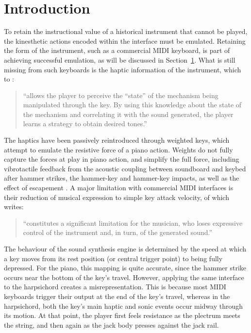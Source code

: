 \section{Introduction}

To retain the instructional value of a historical instrument that cannot be played, the kinesthetic actions encoded within the interface must be emulated. Retaining the form of the instrument, such as a commercial MIDI keyboard, is part of achieving successful emulation, as will be discussed in Section~\ref{}. 
What is still missing from such keyboards is the haptic information of the instrument, which to \textcite{oboe_mikey_2006}:
\begin{quotation}
    ``allows the player to perceive the ``state'' of the mechanism being manipulated through the key. By using this knowledge about the state of the mechanism and correlating it with the sound generated, the player learns a strategy to obtain desired tones.''
\end{quotation}
The haptics have been passively reintroduced through weighted keys, which attempt to emulate the resistive force of a piano action. Weights do not fully capture the forces at play in piano action, and simplify the full force, including vibrotactile feedback from the acoustic coupling between soundboard and keybed after hammer strikes, the hammer-key and hammer-key impacts, as well as the effect of escapement \cite{oboe_mikey_2006,fluckiger_evaluation_2018}. A major limitation with commercial MIDI interfaces is their reduction of musical expression to simple key attack velocity, of which \textcite{oboe_mikey_2006} writes: 
\begin{quotation}
  ``constitutes a significant limitation for the musician, who loses expressive control of the instrument and, in turn, of the generated sound.''
\end{quotation}
The behaviour of the sound synthesis engine is determined by the speed at which a key moves from its rest position (or central trigger point) to being fully depressed. For the piano, this mapping is quite accurate, since the hammer strike occurs near the bottom of the key’s travel. However, applying the same interface to the harpsichord creates a misrepresentation. This is because most MIDI keyboards trigger their output at the end of the key’s travel, whereas in the harpsichord, both the key’s main haptic and sonic events occur midway through its motion. At that point, the player first feels resistance as the plectrum meets the string, and then again as the jack body presses against the jack rail.

